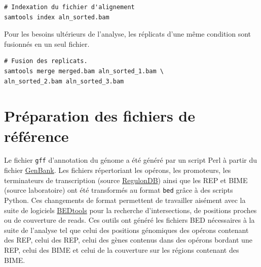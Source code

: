 \documentclass[12pt,a4paper]{report}
\begin{document}
\begin{onehalfspace}
\begin{lstlisting}[frame=single]
# Indexation du fichier d'alignement
samtools index aln_sorted.bam
\end{lstlisting}

Pour les besoins ultérieurs de l'analyse, les réplicats d'une même condition sont fusionnés en un seul fichier.
\begin{lstlisting}[frame=single]
# Fusion des replicats.
samtools merge merged.bam aln_sorted_1.bam \
aln_sorted_2.bam aln_sorted_3.bam
\end{lstlisting}

\section*{Préparation des fichiers de référence}
Le fichier \texttt{\gls{gff}} d'annotation du génome a été généré par un script Perl à partir du fichier \href{http://www.ncbi.nlm.nih.gov/nuccore/NC_000913.2}{GenBank}. Les fichiers répertoriant les opérons, les promoteurs, les terminateurs de transcription (source \href{http://regulondb.ccg.unam.mx/}{RegulonDB}) ainsi que les REP et BIME (source laboratoire) ont été transformés au format \texttt{\gls{bed}} grâce à des scripts Python.
Ces changements de format permettent de travailler aisément avec la suite de logiciels \href{http://bedtools.readthedocs.org/en/latest/}{BEDtools} pour la recherche d'intersections, de positions proches ou de \gls{couverture} de reads. Ces outils ont généré les fichiers BED nécessaires à la suite de l'analyse tel que celui des positions génomiques des opérons contenant des REP, celui des REP, celui des gènes contenus dans des opérons bordant une REP, celui des BIME et celui de la couverture sur les régions contenant des BIME.


\end{onehalfspace}
\end{document}
